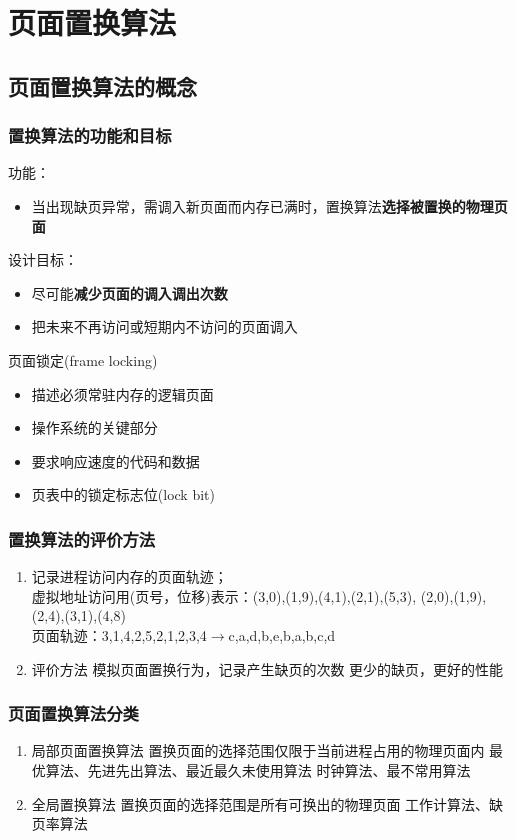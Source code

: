 \chapter{页面置换算法}
\section{页面置换算法的概念}
\subsection{置换算法的功能和目标}
\noindent 功能：
\begin{itemize}
	\item 当出现缺页异常，需调入新页面而内存已满时，置换算法\textbf{选择被置换的物理页面}
\end{itemize}
设计目标：
\begin{itemize}
	\item 尽可能\textbf{减少页面的调入调出次数}
	\item 把未来不再访问或短期内不访问的页面调入
\end{itemize}
页面锁定(frame locking)
\begin{itemize}
	\item 描述必须常驻内存的逻辑页面
	\item 操作系统的关键部分
	\item 要求响应速度的代码和数据
	\item 页表中的锁定标志位(lock bit)
\end{itemize}
\subsection{置换算法的评价方法}
\begin{enumerate}
	\item 记录进程访问内存的页面轨迹；\\
	虚拟地址访问用(页号，位移)表示：(3,0),(1,9),(4,1),(2,1),(5,3),
	(2,0),(1,9),(2,4),(3,1),(4,8)\\
	页面轨迹：3,1,4,2,5,2,1,2,3,4$\rightarrow$c,a,d,b,e,b,a,b,c,d
	\item 评价方法
	\subitem 模拟页面置换行为，记录产生缺页的次数
	\subitem 更少的缺页，更好的性能
\end{enumerate}
\subsection{页面置换算法分类}
\begin{enumerate}
	\item 局部页面置换算法
	\subitem 置换页面的选择范围仅限于当前进程占用的物理页面内
	\subitem 最优算法、先进先出算法、最近最久未使用算法
	\subitem 时钟算法、最不常用算法
	\item 全局置换算法
	\subitem 置换页面的选择范围是所有可换出的物理页面
	\subitem 工作计算法、缺页率算法
\end{enumerate}

